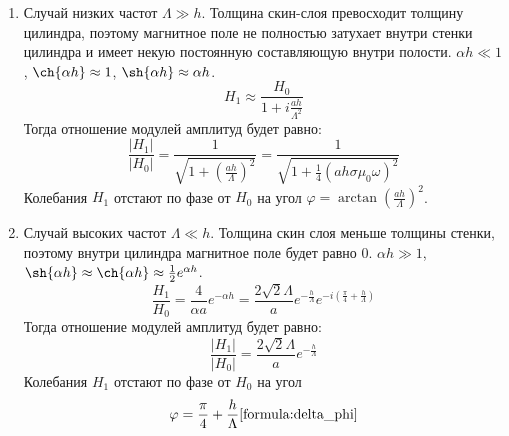 \begin{enumerate}
	\item Случай низких частот $\Lambda \gg h$. Толщина скин-слоя превосходит толщину цилиндра, поэтому магнитное поле не полностью затухает внутри стенки цилиндра и имеет некую постоянную составляющую внутри полости. $\alpha h \ll 1$, $\ch{\alpha h} \approx 1$, $\sh{\alpha h} \approx \alpha h$.
	$$
	H_1 \approx \frac{H_0}{1 + i \frac{ah}{\Lambda^2}}
	$$
	Тогда отношение модулей амплитуд будет равно:
	$$
	\frac{|H_1|}{|H_0|} = \frac{1}{\sqrt{1 + \left( \frac{ah}{\Lambda} \right)^2}} = \frac{1}{\sqrt{1 + \frac{1}{4} \left( a h \sigma \mu_0 \omega \right)^2}}
	$$
	Колебания $H_1$ отстают по фазе от $H_0$ на угол $\varphi = \arctan \left( \frac{ah}{\Lambda} \right)^2 $.
	
	\item Случай высоких частот $\Lambda \ll h$. Толщина скин слоя меньше толщины стенки, поэтому внутри цилиндра магнитное поле будет равно 0. $\alpha h \gg 1$, $\sh{\alpha h} \approx \ch{\alpha h} \approx \frac{1}{2} e^{\alpha h}$.
	$$
	\frac{H_1}{H_0} = \frac{4}{\alpha a} e^{- \alpha h} = \frac{2\sqrt{2}\Lambda}{a} e^{-\frac{h}{\Lambda}} e^{-i \left( \frac{\pi}{4} + \frac{h}{\Lambda}\right)}
	$$
	Тогда отношение модулей амплитуд будет равно:
	$$
	\frac{|H_1|}{|H_0|} = \frac{2\sqrt{2}\Lambda}{a} e^{-\frac{h}{\Lambda}}
	$$
	Колебания $H_1$ отстают по фазе от $H_0$ на угол 
	\begin{equation}
		\varphi = \frac{\pi}{4} + \frac{h}{\Lambda}
		\ref{formula:delta_phi}
	\end{equation}
\end{enumerate}

